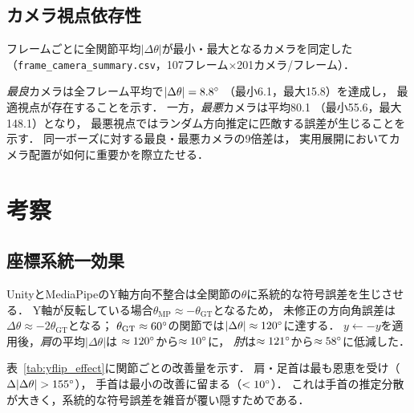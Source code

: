 \documentclass[twocolumn]{article}
\begin{document}
\subsection{カメラ視点依存性}

フレームごとに全関節平均$|\Delta\theta|$が最小・最大となるカメラを同定した
（\texttt{frame\_camera\_summary.csv}，107フレーム$\times$201カメラ/フレーム）．

\emph{最良}カメラは全フレーム平均で$|\Delta\theta|=8.8\degree{}$
（最小6.1\degree{}，最大15.8\degree{}）を達成し，
最適視点が存在することを示す．
一方，\emph{最悪}カメラは平均80.1\degree{}
（最小55.6\degree{}，最大148.1\degree{}）となり，
最悪視点ではランダム方向推定に匹敵する誤差が生じることを示す．
同一ボーズに対する最良・最悪カメラの9倍差は，
実用展開においてカメラ配置が如何に重要かを際立たせる．

\section{考察}

\subsection{座標系統一効果}

UnityとMediaPipeのY軸方向不整合は全関節の$\theta$に系統的な符号誤差を生じさせる．
Y軸が反転している場合$\theta_{\text{MP}} \approx -\theta_{\text{GT}}$となるため，
未修正の方向角誤差は$\Delta\theta \approx -2\theta_{\text{GT}}$となる；
$\theta_{\text{GT}} \approx 60\degree{}$の関節では$|\Delta\theta| \approx 120\degree{}$に達する．
$y \leftarrow -y$を適用後，\emph{肩}の平均$|\Delta\theta|$は
$\approx120\degree{}$から$\approx10\degree{}$に，
\emph{肘}は$\approx121\degree{}$から$\approx58\degree{}$に低減した\cite{mediapipe_coord_issue}．

表~\ref{tab:yflip_effect}に関節ごとの改善量を示す．
肩・足首は最も恩恵を受け（$\Delta|\Delta\theta|>155\degree{}$），
手首は最小の改善に留まる（$<10\degree{}$）．
これは手首の推定分散が大きく，系統的な符号誤差を雑音が覆い隠すためである．
\end{document}
